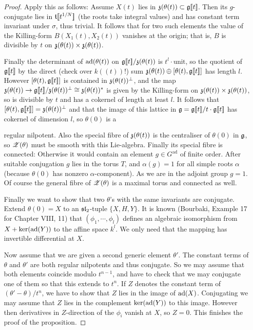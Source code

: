 \documentclass[12pt,english]{smfart}
\theoremstyle{plain} \newtheorem{innerthm}{Theorem} \newtheorem{innerlem}{Lemma} \newtheorem{innerprop}{Proposition} \newtheorem{innercor}{Corollary} \theoremstyle{definition} \newtheorem{innerdefn}{Definition} \newtheorem{innerconstr}{Construction} \theoremstyle{remark} \newtheorem*{remark}{Remark} \newtheorem*{remarks}{Remarks} \newtheorem*{applications}{Applications}
\begin{document}
\begin{proof}
Apply this as follows: Assume $X(t)$ lies in $\mathfrak{z}(\theta(t))\subset\mathfrak{g}[\![t]\!]$. Then its $g$-conjugate lies in $\mathfrak{t}[\![t^{1/N}]\!]$ (the roots take integral values) and has constant term invariant under $\sigma$, thus trivial. It follows that for two such elements the value of the Killing-form $B(X_1(t),X_2(t))$ vanishes at the origin; that is, $B$ is divisible by $t$ on $\mathfrak{z}(\theta(t))\times\mathfrak{z}(\theta(t))$.

Finally the determinant of $\operatorname{ad}(\theta(t))$ on $\mathfrak{g}[\![t]\!]/\mathfrak{z}(\theta(t))$ is $t^l\cdot\text{unit}$, so the quotient of $\mathfrak{g}[\![t]\!]$ by the direct (check over $k((t))$!) sum $\mathfrak{z}(\theta(t))\oplus[\theta(t),\mathfrak{g}[\![t]\!]]$ has length $l$. However $[\theta(t),\mathfrak{g}[\![t]\!]]$ is contained in $\mathfrak{z}(\theta(t))^\perp$, and the map $\mathfrak{z}(\theta(t))\to\mathfrak{g}[\![t]\!]/\mathfrak{z}(\theta(t))^\perp\cong\mathfrak{z}(\theta(t))^*$ is given by the Killing-form on $\mathfrak{z}(\theta(t))\times\mathfrak{z}(\theta(t))$, so is divisible by $t$ and has a cokernel of length at least $l$. It follows that $[\theta(t),\mathfrak{g}[\![t]\!]]=\mathfrak{z}(\theta(t))^\perp$ and that the image of this lattice in $\mathfrak{g}=\mathfrak{g}[\![t]\!]/t\cdot\mathfrak{g}[\![t]\!]$ has cokernel of dimension $l$, so $\theta(0)$ is a


regular nilpotent. Also the special fibre of $\mathfrak{z}(\theta(t))$ is the centraliser of $\theta(0)$ in $\mathfrak{g}$, so $\mathscr{Z}(\theta)$ must be smooth with this Lie-algebra. Finally its special fibre is connected: Otherwise it would contain an element $g\in G^{\mathrm{ad}}$ of finite order. After suitable conjugation $g$ lies in the torus $T$, and $\alpha(g)=1$ for all simple roots $\alpha$ (because $\theta(0)$ has nonzero $\alpha$-component). As we are in the adjoint group $g=1$. Of course the general fibre of $\mathscr{Z}(\theta)$ is a maximal torus and connected as well.

Finally we want to show that two $\theta$'s with the same invariants are conjugate. Extend $\theta(0)=X$ to an $\mathfrak{sl}_2$-tuple $\{X,H,Y\}$. It is known (Bourbaki, Example 17 for Chapter VIII, 11) that $(\phi_1,\cdots,\phi_l)$ defines an algebraic isomorphism from $X+\ker(\operatorname{ad}(Y))$ to the affine space $k^l$. We only need that the mapping has invertible differential at $X$.

Now assume that we are given a second generic element $\theta'$. The constant terms of $\theta$ and $\theta'$ are both regular nilpotents and thus conjugate. So we may assume that both elements coincide modulo $t^{n-1}$, and have to check that we may conjugate one of them so that this extends to $t^n$. If $Z$ denotes the constant term of $(\theta'-\theta)/t^n$, we have to show that $Z$ lies in the image of $\operatorname{ad}(X)$. Conjugating we may assume that $Z$ lies in the complement $\ker(\operatorname{ad}(Y))$ to this image. However then derivatives in $Z$-direction of the $\phi_i$ vanish at $X$, so $Z=0$. This finishes the proof of the proposition.
\end{proof}
\end{document}
